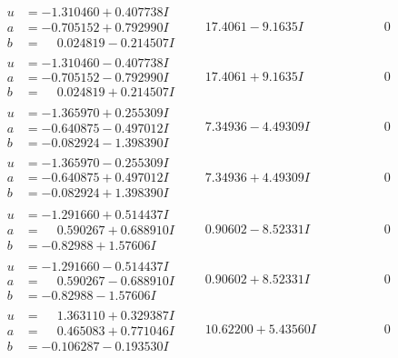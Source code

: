 \documentclass[1p]{elsarticle_modified}
\theoremstyle{definition}
\begin{document}
$$\begin{array}{c|c|c}
\begin{aligned}
u &= -1.310460 + 0.407738 I \\
a &= -0.705152 + 0.792990 I \\
b &= \phantom{-}0.024819 - 0.214507 I\end{aligned}
 & \phantom{-}17.4061 - 9.1635 I & \phantom{-0.000000 } 0 \\ \hline\begin{aligned}
u &= -1.310460 - 0.407738 I \\
a &= -0.705152 - 0.792990 I \\
b &= \phantom{-}0.024819 + 0.214507 I\end{aligned}
 & \phantom{-}17.4061 + 9.1635 I & \phantom{-0.000000 } 0 \\ \hline\begin{aligned}
u &= -1.365970 + 0.255309 I \\
a &= -0.640875 - 0.497012 I \\
b &= -0.082924 - 1.398390 I\end{aligned}
 & \phantom{-}7.34936 - 4.49309 I & \phantom{-0.000000 } 0 \\ \hline\begin{aligned}
u &= -1.365970 - 0.255309 I \\
a &= -0.640875 + 0.497012 I \\
b &= -0.082924 + 1.398390 I\end{aligned}
 & \phantom{-}7.34936 + 4.49309 I & \phantom{-0.000000 } 0 \\ \hline\begin{aligned}
u &= -1.291660 + 0.514437 I \\
a &= \phantom{-}0.590267 + 0.688910 I \\
b &= -0.82988 + 1.57606 I\end{aligned}
 & \phantom{-}0.90602 - 8.52331 I & \phantom{-0.000000 } 0 \\ \hline\begin{aligned}
u &= -1.291660 - 0.514437 I \\
a &= \phantom{-}0.590267 - 0.688910 I \\
b &= -0.82988 - 1.57606 I\end{aligned}
 & \phantom{-}0.90602 + 8.52331 I & \phantom{-0.000000 } 0 \\ \hline\begin{aligned}
u &= \phantom{-}1.363110 + 0.329387 I \\
a &= \phantom{-}0.465083 + 0.771046 I \\
b &= -0.106287 - 0.193530 I\end{aligned}
 & \phantom{-}10.62200 + 5.43560 I & \phantom{-0.000000 } 0 \\ \hline\begin{aligned}

\end{aligned}
\end{array}$$
\end{document}
